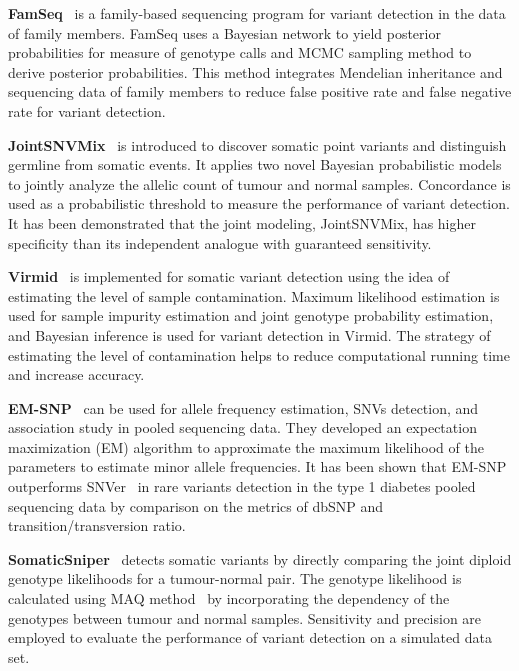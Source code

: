 \documentclass[a4,center,fleqn]{NAR}
\begin{document}
\textbf{FamSeq}~\citep{Peng2013} is a family-based sequencing program for variant detection in the data of family members.
FamSeq uses a Bayesian network to yield posterior probabilities for measure of genotype calls and MCMC sampling method to derive posterior probabilities.
This method integrates Mendelian inheritance and sequencing data of family members to reduce false positive rate and false negative rate for variant detection.

\textbf{JointSNVMix}~\citep{Roth2012} is introduced to discover somatic point variants and distinguish germline from somatic events.
It applies two novel Bayesian probabilistic models to jointly analyze the allelic count of tumour and normal samples.
Concordance is used as a probabilistic threshold to measure the performance of variant detection.
It has been demonstrated that the joint modeling, JointSNVMix, has higher specificity than its independent analogue with guaranteed sensitivity.

\textbf{Virmid}~\citep{Kim2013} is implemented for somatic variant detection using the idea of estimating the level of sample contamination.
Maximum likelihood estimation is used for sample impurity estimation and joint genotype probability estimation, and Bayesian inference is used for variant detection in Virmid.
The strategy of estimating the level of contamination helps to reduce computational running time and increase accuracy.

\textbf{EM-SNP}~\citep{Chen2013} can be used for allele frequency estimation, SNVs detection, and association study in pooled sequencing data.
They developed an expectation maximization (EM) algorithm to approximate the maximum likelihood of the parameters to estimate minor allele frequencies.
It has been shown that EM-SNP outperforms SNVer~\citep{Wei2011} in rare variants detection in the type 1 diabetes pooled sequencing data by comparison on the metrics of dbSNP and transition/transversion ratio.

\textbf{SomaticSniper}~\citep{Larson2012} detects somatic variants by directly comparing the joint diploid genotype likelihoods for a tumour-normal pair.
The genotype likelihood is calculated using MAQ method~\citep{Li2008} by incorporating the dependency of the genotypes between tumour and normal samples.
Sensitivity and precision are employed to evaluate the performance of variant detection on a simulated data set.
\end{document}
